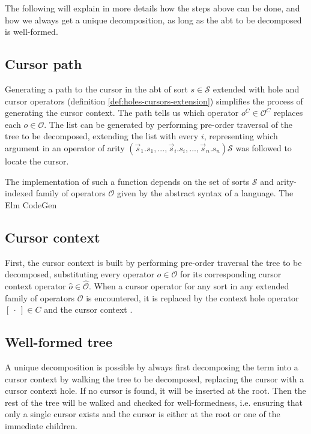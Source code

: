 \documentclass{article}
\begin{document}
The following will explain in more details how the steps above can be done, and how we always get a unique decomposition, as long as the abt to be decomposed is well-formed. 

\subsection{Cursor path}

Generating a path to the cursor in the abt of sort $s \in \mathcal{S}$ extended with hole and cursor operators (definition \ref{def:holes-cursors-extension}) simplifies the process of generating the cursor context. The path tells us which operator $o^C \in \mathcal{O}^C$ replaces each $o \in \mathcal{O}$. 
The list can be generated by performing pre-order traversal of the tree to be decomposed, extending the list with every $i$, representing which argument in an operator of arity $(\vec{s}_1.s_1, ... , \vec{s}_i.s_i, ..., \vec{s}_n.s_n)\mathcal{S}$ was followed to locate the cursor.

The implementation of such a function depends on the set of sorts $\mathcal{S}$ and arity-indexed family of operators $\mathcal{O}$ given by the abstract syntax of a language. The Elm CodeGen\cite{elm-codegen-package} 

\subsection{Cursor context}

First, the cursor context is built by performing pre-order traversal the tree to be decomposed, substituting every operator $o \in \mathcal{O}$ for its corresponding cursor context operator $\hat{o} \in \hat{\mathcal{O}}$. When a cursor operator for any sort in any extended family of operators $\mathcal{O}$ is encountered, it is replaced by the context hole operator $[ \ \cdot \ ] \in C$ and the cursor context . 

\subsection{Well-formed tree}

A unique decomposition is possible by always first decomposing the term into a cursor context by walking the tree to be decomposed, replacing the cursor with a cursor context hole. If no cursor is found, it will be inserted at the root. Then the rest of the tree will be walked and checked for well-formedness, i.e. ensuring that only a single cursor exists and the cursor is either at the root or one of the immediate children.

\printbibliography
\end{document}
